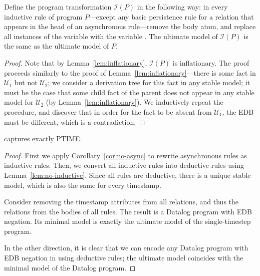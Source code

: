 \begin{lemma}
\label{lem:no-inductive}
Define the program transformation $\mathcal{I}(P)$ in the following way: in every inductive rule of \slang program 
$P$---except any basic persistence rule for a relation that appears in the head of an asynchronous rule---remove 
the  body atom, and replace all instances of the variable  with the variable .  
The ultimate model of $\mathcal{I}(P)$ is the same as the ultimate model of $P$.
\end{lemma}
\begin{proof}
Note that by Lemma~\ref{lem:inflationary}, $\mathcal{I}(P)$ is inflationary.  The proof proceeds similarly to the proof of Lemma~\ref{lem:inflationary}---there is some fact in $\mathcal{U}_1$ but not $\mathcal{U}_2$; we consider a derivation tree for this fact in any stable model; it must be the case that some child fact of the parent does not appear in any stable model for $\mathcal{U}_2$ (by Lemma~\ref{lem:inflationary}).  We inductively repeat the procedure, and discover that in order for the fact to be absent from $\mathcal{U}_1$, the EDB must be different, which is a contradiction.
\end{proof}


\begin{theorem}
\label{thm:ptime}
\slang captures exactly PTIME.
\end{theorem}
\begin{proof}
First we apply Corollary~\ref{cor:no-async} to rewrite asynchronous rules as inductive rules.  Then, we convert all inductive rules into deductive rules using Lemma~\ref{lem:no-inductive}.  Since all rules are deductive, there is a unique stable model, which is also the same for every timestamp.

Consider removing the timestamp attributes from all relations, and thus the  relations from the bodies of all rules.  The result is a Datalog program with EDB negation.  Its minimal model is exactly the ultimate model of the single-timestep \slang program.

In the other direction, it is clear that we can encode any Datalog program with EDB negation in \slang using deductive rules; the ultimate model coincides with the minimal model of the Datalog program.
\end{proof}



